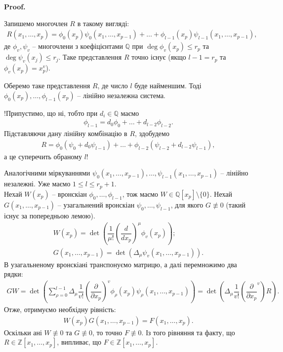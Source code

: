 \documentclass[a4paper, 10pt]{article}
\makeatletter
\theoremstyle{theoremdd}
\theoremstyle{theoremdd}
\theoremstyle{theoremdd}
\theoremstyle{theoremdd}
\theoremstyle{theoremdd}
\theoremstyle{theoremdd}
\theoremstyle{theoremdd}
\theoremstyle{theoremdd}
\theoremstyle{theoremdd}
\theoremstyle{theoremdd}
\theoremstyle{theoremdd}
\theoremstyle{theoremdd}
\theoremstyle{theoremdd}
\theoremstyle{theoremdd}
\theoremstyle{theoremdd}
\renewenvironment{proof}[1][Proof.\\]{\par
\pushQED{\hfill \qed}%
\normalfont \topsep6\p@\@plus6\p@\relax
\trivlist
\item\relax
{\bfseries
#1\@addpunct{.}}\hspace\labelsep\ignorespaces
}{%
\popQED\endtrivlist\@endpefalse
}
\makeatother
\begin{document}
\begin{proof}
Запишемо многочлен $R$ в такому вигляді:
\begin{align*}
R(x_1,\dots,x_p) = \phi_0(x_p) \psi_0(x_1,\dots,x_{p-1}) + \dots + \phi_{l-1}(x_p) \psi_{l-1}(x_1,\dots,x_{p-1}),
\end{align*}
де $\phi_v,\psi_v$ -- многочлени з коефіцієнтами $\mathbb{Q}$ при $\deg \phi_v(x_p) \leq r_p$ та $\deg \psi_v(x_j) \leq r_j$. Таке представлення $R$ точно існує (якщо $l-1 = r_p$ та $\phi_v(x_p) = x_p^v$).

Оберемо таке представлення $R$, де число $l$ буде найменшим. Тоді $\phi_0(x_p),\dots,\phi_{l-1}(x_p)$ -- лінійно незалежна система.

!Припустимо, що ні, тобто при $d_i \in \mathbb{Q}$ маємо
\begin{align*}
\phi_{l-1} = d_0 \phi_0 + \dots + d_{l-2} \phi_{l-2}.
\end{align*}
Підставляючи дану лінійну комбінацію в $R$, здобудемо
\begin{align*}
R = \phi_0(\psi_0 + d_0 \psi_{l-1}) + \dots + \phi_{l-2} (\psi_{l-2} + d_{l-2} \psi_{l-1}),
\end{align*}
а це суперечить обраному $l$!

Аналогічними міркуваннями $\psi_0(x_1,\dots,x_{p-1}), \dots, \psi_{l-1}(x_1,\dots,x_{p-1})$ -- лінійно незалежні. Уже маємо $1 \leq l \leq r_p+1$.
\bigskip \\
Нехай $W(x_p)$ -- вронскіан $\phi_0,\dots,\phi_{l-1}$, тож маємо $W \in \mathbb{Q}[x_p] \setminus \{0\}$. Нехай $G(x_1,\dots,x_{p-1})$ -- узагальнений вронскіан $\psi_0,\dots,\psi_{l-1}$, для якого $G \not\equiv 0$ (такий існує за попередньою лемою).
\begin{align*}
W(x_p) = \det \left( \dfrac{1}{\mu !} \left( \dfrac{d}{d x_p}\right)^\mu \phi_v(x_p) \right); \\
G(x_1,\dots,x_{p-1}) = \det ( \Delta_\mu \psi_v(x_1,\dots,x_{p-1})).
\end{align*}
В узагальненому вронскіані транспонуємо матрицю, а далі перемножимо два рядки:
\begin{align*}
GW = \det \left( \sum_{\rho=0}^{l-1} \Delta_\mu \dfrac{1}{v!} \left( \dfrac{\partial}{\partial x_p} \right)^v \phi_\rho(x_p) \psi_\rho(x_1,\dots,x_{p-1}) \right) = \det \left( \Delta_\mu \dfrac{1}{v!} \left( \dfrac{\partial}{\partial x_p}^v \right) R \right).
\end{align*}
Отже, отримуємо необхідну рівність:
\begin{align*}
W(x_p) G(x_1,\dots,x_{p-1}) = F(x_1,\dots,x_p).
\end{align*}
Оскільки ані $W \not\equiv 0$ та $G \not\equiv 0$, то точно $F \not\equiv 0$. Із того рівняння та факту, що $R \in \mathbb{Z}[x_1,\dots,x_p]$, випливає, що $F \in \mathbb{Z}[x_1,\dots,x_p]$.


\end{proof}
\end{document}
